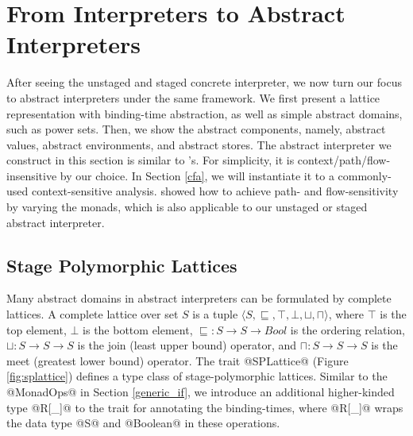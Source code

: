 \section{From Interpreters to Abstract Interpreters} \label{unstaged_abs}

After seeing the unstaged and staged concrete interpreter, we now turn our
focus to abstract interpreters under the same framework. We first present a
lattice representation with binding-time abstraction, as well as simple
abstract domains, such as power sets.  Then, we show the abstract
components, namely, abstract values, abstract environments, and abstract stores.
The abstract interpreter we construct in this section is similar to
\citet{DBLP:journals/pacmpl/DaraisLNH17}'s. For simplicity, it is
context/path/flow-insensitive by our choice. In Section \ref{cfa}, we will
instantiate it to a commonly-used context-sensitive analysis.
\citet{Darais:2015:GTM:2814270.2814308} showed how to achieve path- and
flow-sensitivity by varying the monads, which is also applicable to our
unstaged or staged abstract interpreter.

\subsection{Stage Polymorphic Lattices} \label{stagedpoly_lat}

Many abstract domains in abstract interpreters can be formulated by complete
lattices.
A complete lattice over set $S$ is a tuple $\langle S, \sqsubseteq, \top,
\bot, \sqcup, \sqcap \rangle$, where $\top$ is the top element, $\bot$ is the
bottom element, $\sqsubseteq : S \to S \to Bool$ is the
ordering relation, $\sqcup: S \to S \to S$ is the join (least upper bound)
operator, and $\sqcap: S \to S \to S$ is the meet (greatest lower bound)
operator. The trait @SPLattice@ (Figure \ref{fig:splattice}) defines a type
class of stage-polymorphic lattices. Similar to the @MonadOps@ in Section
\ref{generic_if}, we introduce an additional higher-kinded type @R[_]@ to the
trait for annotating the binding-times, where @R[_]@ wraps the data type
@S@ and @Boolean@ in these operations.

